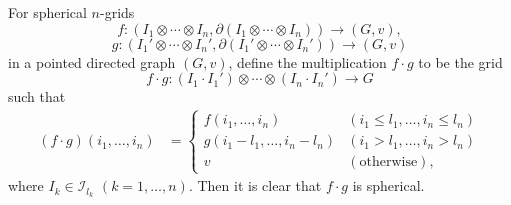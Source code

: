 \documentclass[oneside, 12pt]{amsart}
\numberwithin{equation}{section}
\theoremstyle{plain}
\theoremstyle{definition}
\theoremstyle{remark}
\begin{document}
	For spherical $n$-grids
	\[
	f\colon(I_1\otimes\cdots\otimes I_n,\partial(I_1\otimes\cdots\otimes I_n))\to(G,v),
	\]
	\[
	g\colon(I_1'\otimes\cdots\otimes I_n',\partial(I_1'\otimes\cdots\otimes I_n'))\to(G,v)
	\] 
	in a pointed directed graph $(G,v)$, define the multiplication $f\cdot g$ to be the grid
	\[
	f\cdot g\colon(I_1\cdot I_1')\otimes\cdots\otimes(I_n\cdot I_n')\to G
	\]
	such that
	\begin{align*}
		(f\cdot g)(i_1,\ldots,i_n)&=
		\begin{cases}
			f(i_1,\ldots,i_n)&(i_1\le l_1,\ldots,i_n\le l_n)\\
			g(i_1-l_1,\ldots,i_n-l_n)&(i_1>l_1,\ldots,i_n>l_n)\\
			v&(\text{otherwise}),
		\end{cases}
	\end{align*}
	where $I_k\in\mathcal{I}_{l_k}$ $(k=1,\ldots,n)$. Then it is clear that $f\cdot g$ is spherical.
	
	
	
\end{document}
